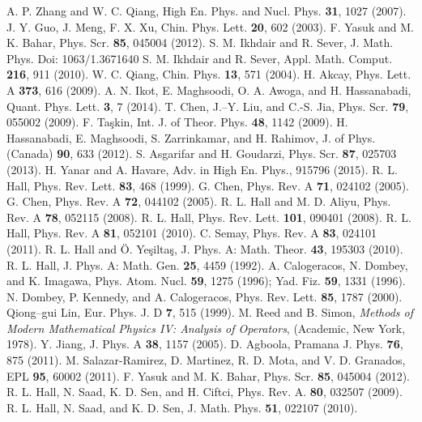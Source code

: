 \documentclass[amsmath,amssymb,superscriptaddress,showkeys, showpacs, aps, nofootinbib]{revtex4}
\begin{document}
\begin{thebibliography}{99}
 A. P. Zhang and W. C. Qiang, High En. Phys. and Nucl. Phys. {\bf 31}, 1027 (2007).
 J. Y. Guo, J. Meng, F. X. Xu, Chin. Phys. Lett. {\bf 20}, 602 (2003).
 F. Yasuk and M. K. Bahar, Phys. Scr. {\bf 85}, 045004 (2012).
 S. M. Ikhdair and R. Sever, J. Math. Phys. Doi: 1063/1.3671640
 S. M. Ikhdair and R. Sever, Appl. Math. Comput. {\bf 216}, 911 (2010).
 W. C. Qiang, Chin. Phys. {\bf 13}, 571 (2004).
 H. Akcay, Phys. Lett. A {\bf 373}, 616 (2009).
 A. N. Ikot, E. Maghsoodi, O. A. Awoga, and H. Hassanabadi, Quant. Phys. Lett. {\bf 3}, 7 (2014).
 T. Chen, J.--Y. Liu, and C.-S. Jia, Phys. Scr. {\bf 79}, 055002 (2009).
 F. Ta\c{s}kin, Int. J. of Theor. Phys. {\bf 48}, 1142 (2009).
 H. Hassanabadi, E. Maghsoodi, S. Zarrinkamar, and H. Rahimov, J. of Phys. (Canada) {\bf 90}, 633 (2012).
 S. Asgarifar and H. Goudarzi, Phys. Scr. {\bf 87}, 025703 (2013).
 H. Yanar and A. Havare, Adv. in High En. Phys., 915796 (2015).
 R. L. Hall, Phys. Rev. Lett. {\bf 83}, 468 (1999).
 G. Chen, Phys. Rev. A {\bf 71}, 024102 (2005).
 G. Chen, Phys. Rev. A {\bf 72}, 044102 (2005).
 R. L. Hall and M. D. Aliyu, Phys. Rev. A {\bf 78}, 052115 (2008).
 R. L. Hall, Phys. Rev. Lett. {\bf 101}, 090401 (2008).
 R. L. Hall, Phys. Rev. A {\bf 81}, 052101 (2010).
 C. Semay, Phys. Rev. A {\bf 83}, 024101 (2011).
 R. L. Hall and \"{O}. Ye\c{s}ilta\c{s}, J. Phys. A: Math. Theor. {\bf 43}, 195303 (2010).
R. L. Hall, J. Phys. A: Math. Gen. {\bf 25}, 4459 (1992). 
A. Calogeracos, N. Dombey, and K. Imagawa, Phys. Atom. Nucl. {\bf 59}, 1275 (1996); Yad. Fiz. {\bf 59}, 1331 (1996).
N. Dombey, P. Kennedy, and A. Calogeracos, Phys. Rev. Lett. {\bf 85}, 1787 (2000). 
 Qiong--gui Lin, Eur. Phys. J. D {\bf 7}, 515 (1999).
 M. Reed and B. Simon, {\it Methods of Modern Mathematical Physics IV: Analysis of Operators}, (Academic, New York, 1978). 
Y. Jiang, J. Phys. A {\bf 38}, 1157 (2005).
D. Agboola, Pramana J. Phys. {\bf 76}, 875 (2011). 
M. Salazar-Ramirez, D. Martinez, R. D. Mota, and V. D. Granados, EPL {\bf 95}, 60002 (2011). 
F. Yasuk and M. K. Bahar, Phys. Scr. {\bf 85}, 045004 (2012).
 R. L. Hall, N. Saad, K. D. Sen, and H. Ciftci, Phys. Rev. A. {\bf 80}, 032507 (2009).
 R. L. Hall, N. Saad, and K. D. Sen, J. Math. Phys. {\bf 51}, 022107 (2010).

\end{thebibliography}
\end{document}
